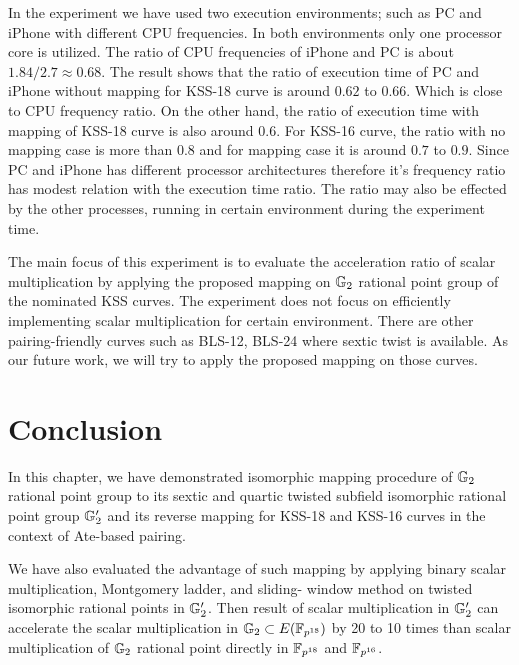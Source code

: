 In the experiment we have used two execution environments; such as PC and iPhone with different CPU frequencies. 
In both environments only one processor core is utilized.
 The ratio of CPU frequencies of  iPhone and PC is about $1.84 / 2.7 \approx 0.68$. 
The result  shows that the ratio of execution time of PC and iPhone without mapping  for KSS-18 curve is around $0.62$ to $0.66$.
Which is close to CPU frequency ratio.
On the other hand, the ratio of execution time with mapping  of KSS-18 curve is also around $0.6$. 
For KSS-16 curve, the ratio with no mapping case is more than $0.8$ and for mapping case it is around $0.7$ to $0.9$.   
Since PC and iPhone has different processor architectures therefore it's frequency ratio has modest relation with the execution time ratio. 
The ratio may also be effected by the other processes, running in certain environment during the experiment time.

The main focus of this experiment is to evaluate the  acceleration ratio of scalar multiplication by applying the proposed mapping on ${\mathbb{G}}_{2}$ rational point group of the nominated KSS curves. The experiment does not focus on efficiently implementing scalar multiplication for certain environment. There are other pairing-friendly curves such as BLS-12, BLS-24 \cite{JC:FreScoTes10} where sextic twist is available. As our future work, we will try to apply the proposed mapping on those curves.

\section{Conclusion}
In this chapter, we have demonstrated isomorphic mapping procedure of ${\mathbb{G}}_{2}$ rational point group to its sextic and quartic twisted subfield isomorphic rational point group ${\mathbb{G}}_{2}'$  and its reverse mapping for KSS-18 and KSS-16 curves in the context of Ate-based pairing. 

We have also evaluated the advantage of such mapping by applying binary scalar multiplication, Montgomery ladder, and sliding- window method on twisted isomorphic rational points in ${\mathbb{G}}_{2}'$. 
Then result of  scalar multiplication in ${\mathbb{G}}_{2}'$ can accelerate the scalar multiplication in ${\mathbb{G}}_{2} \subset E(\mathbb{F}_{p^{18}})$ by   20 to 10 times than scalar multiplication of ${\mathbb{G}}_{2}$ rational point directly in $\mathbb{F}_{p^{18}}$ and $\mathbb{F}_{p^{16}}$. 
